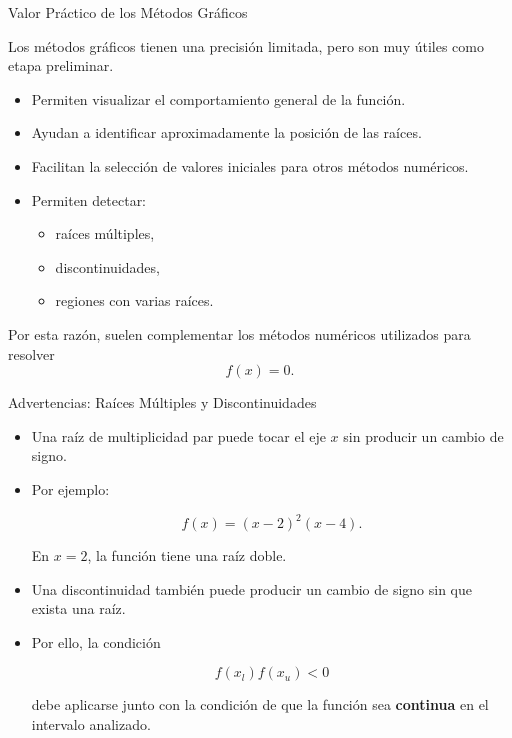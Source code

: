 \documentclass[../../main.tex]{subfiles}
\begin{document}

\begin{frame}{Valor Práctico de los Métodos Gráficos}

Los métodos gráficos tienen una precisión limitada, pero son muy útiles como etapa preliminar.

\begin{itemize}

    \item Permiten visualizar el comportamiento general de la función.

    \item Ayudan a identificar aproximadamente la posición de las raíces.

    \item Facilitan la selección de valores iniciales para otros métodos numéricos.

    \item Permiten detectar:

    \begin{itemize}
        \item raíces múltiples,
        \item discontinuidades,
        \item regiones con varias raíces.
    \end{itemize}

\end{itemize}

Por esta razón, suelen complementar los métodos numéricos utilizados para resolver
\[
f(x)=0.
\]

\end{frame}



\begin{frame}{Advertencias: Raíces Múltiples y Discontinuidades}

\begin{itemize}

    \item Una raíz de multiplicidad par puede tocar el eje \(x\) sin producir un cambio de signo.

    \item Por ejemplo:

    \[
    f(x)=(x-2)^2(x-4).
    \]

    En \(x=2\), la función tiene una raíz doble.

    \item Una discontinuidad también puede producir un cambio de signo sin que exista una raíz.

    \item Por ello, la condición

    \[
    f(x_l)f(x_u)<0
    \]

    debe aplicarse junto con la condición de que la función sea \textbf{continua} en el intervalo analizado.

\end{itemize}

\end{frame}
\end{document}
